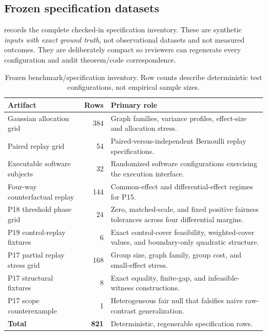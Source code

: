 \subsection{Frozen specification datasets}

 records the complete checked-in specification
inventory. These are synthetic \emph{inputs with exact ground truth}, not
observational datasets and not measured outcomes. They are deliberately compact
so reviewers can regenerate every configuration and audit theorem/code
correspondence.

\begin{table}[H]
\centering
\caption{Frozen benchmark/specification inventory. Row counts describe
deterministic test configurations, not empirical sample sizes.}
\label{tab:benchmark-inventory}
\small
\begin{tabular}{@{}p{}r p{}@{}}
\toprule
Artifact & Rows & Primary role \\
\midrule
Gaussian allocation grid & 384 & Graph families, variance profiles, effect-size and allocation stress. \\
Paired replay grid & 54 & Paired-versus-independent Bernoulli replay specifications. \\
Executable software subjects & 32 & Randomized software configurations exercising the execution interface. \\
Four-way counterfactual replay & 144 & Common-effect and differential-effect regimes for P15. \\
P18 threshold phase grid & 24 & Zero, matched-scale, and fixed positive fairness tolerances across four differential margins. \\
P19 control-replay fixtures & 6 & Exact control-cover feasibility, weighted-cover values, and boundary-only quadratic structure. \\
P17 partial replay stress grid & 168 & Group size, graph family, group cost, and small-effect stress. \\
P17 structural fixtures & 8 & Exact equality, finite-gap, and infeasible-witness constructions. \\
P17 scope counterexample & 1 & Heterogeneous fair null that falsifies naive raw-contrast generalization. \\
\midrule
\textbf{Total} & \textbf{821} & Deterministic, regenerable specification rows. \\
\bottomrule
\end{tabular}
\end{table}


